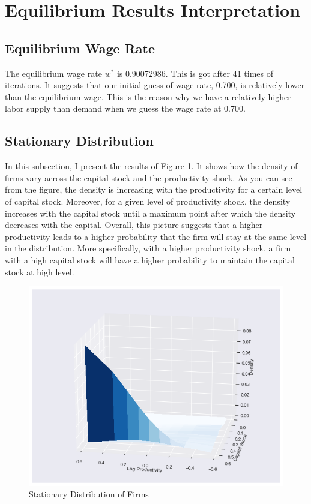 \documentclass[letterpaper,12pt]{article}
\theoremstyle{definition}
\begin{document}
\section{Equilibrium Results Interpretation}

\subsection{Equilibrium Wage Rate}

The equilibrium wage rate $ w^* $ is 0.90072986. This is got after 41 times of iterations. It suggests that our initial guess of wage rate, 0.700, is relatively lower than the equilibrium wage. This is the reason why we have a relatively higher labor supply than demand when we guess the wage rate at 0.700.

\subsection{Stationary Distribution}

In this subsection, I present the results of Figure \ref{fig:figure_std}. It shows how the density of firms vary across the capital stock and the productivity shock. As you can see from the figure, the density is increasing with the productivity for a certain level of capital stock. Moreover, for a given level of productivity shock, the density increases with the capital stock until a maximum point after which the density decreases with the capital. Overall, this picture suggests that a higher productivity leads to a higher probability that the firm will stay at the same level in the distribution. More specifically, with a higher productivity shock, a firm with a high capital stock will have a higher probability to maintain the capital stock at high level.

\begin{figure}[h]
	\centering
	\includegraphics[width=\textwidth]{figure_std}
	\caption{Stationary Distribution of Firms}
	\label{fig:figure_std}
\end{figure}
\end{document}
